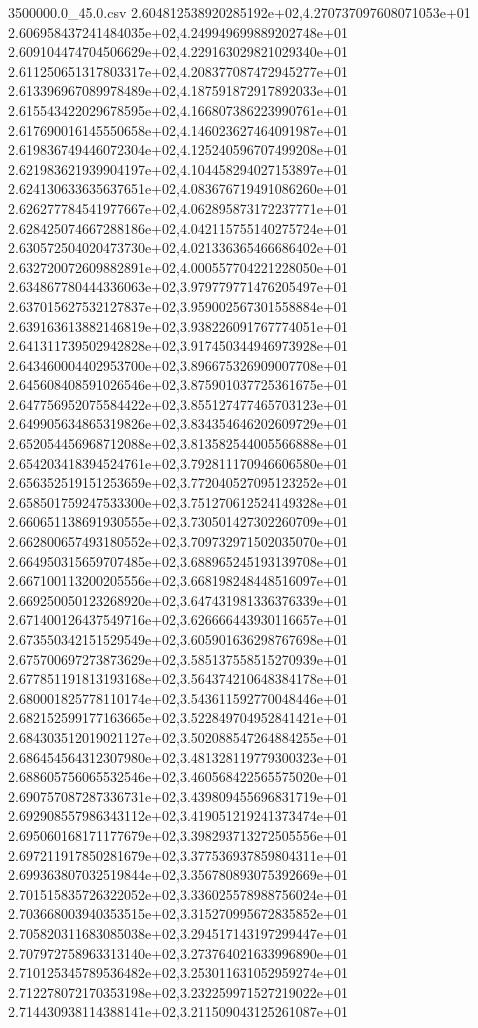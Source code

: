 \begin{filecontents*}{3500000.0_45.0.csv}
2.604812538920285192e+02,4.270737097608071053e+01
2.606958437241484035e+02,4.249949699889202748e+01
2.609104474704506629e+02,4.229163029821029340e+01
2.611250651317803317e+02,4.208377087472945277e+01
2.613396967089978489e+02,4.187591872917892033e+01
2.615543422029678595e+02,4.166807386223990761e+01
2.617690016145550658e+02,4.146023627464091987e+01
2.619836749446072304e+02,4.125240596707499208e+01
2.621983621939904197e+02,4.104458294027153897e+01
2.624130633635637651e+02,4.083676719491086260e+01
2.626277784541977667e+02,4.062895873172237771e+01
2.628425074667288186e+02,4.042115755140275724e+01
2.630572504020473730e+02,4.021336365466686402e+01
2.632720072609882891e+02,4.000557704221228050e+01
2.634867780444336063e+02,3.979779771476205497e+01
2.637015627532127837e+02,3.959002567301558884e+01
2.639163613882146819e+02,3.938226091767774051e+01
2.641311739502942828e+02,3.917450344946973928e+01
2.643460004402953700e+02,3.896675326909007708e+01
2.645608408591026546e+02,3.875901037725361675e+01
2.647756952075584422e+02,3.855127477465703123e+01
2.649905634865319826e+02,3.834354646202609729e+01
2.652054456968712088e+02,3.813582544005566888e+01
2.654203418394524761e+02,3.792811170946606580e+01
2.656352519151253659e+02,3.772040527095123252e+01
2.658501759247533300e+02,3.751270612524149328e+01
2.660651138691930555e+02,3.730501427302260709e+01
2.662800657493180552e+02,3.709732971502035070e+01
2.664950315659707485e+02,3.688965245193139708e+01
2.667100113200205556e+02,3.668198248448516097e+01
2.669250050123268920e+02,3.647431981336376339e+01
2.671400126437549716e+02,3.626666443930116657e+01
2.673550342151529549e+02,3.605901636298767698e+01
2.675700697273873629e+02,3.585137558515270939e+01
2.677851191813193168e+02,3.564374210648384178e+01
2.680001825778110174e+02,3.543611592770048446e+01
2.682152599177163665e+02,3.522849704952841421e+01
2.684303512019021127e+02,3.502088547264884255e+01
2.686454564312307980e+02,3.481328119779300323e+01
2.688605756065532546e+02,3.460568422565575020e+01
2.690757087287336731e+02,3.439809455696831719e+01
2.692908557986343112e+02,3.419051219241373474e+01
2.695060168171177679e+02,3.398293713272505556e+01
2.697211917850281679e+02,3.377536937859804311e+01
2.699363807032519844e+02,3.356780893075392669e+01
2.701515835726322052e+02,3.336025578988756024e+01
2.703668003940353515e+02,3.315270995672835852e+01
2.705820311683085038e+02,3.294517143197299447e+01
2.707972758963313140e+02,3.273764021633996890e+01
2.710125345789536482e+02,3.253011631052959274e+01
2.712278072170353198e+02,3.232259971527219022e+01
2.714430938114388141e+02,3.211509043125261087e+01

\end{filecontents*}
